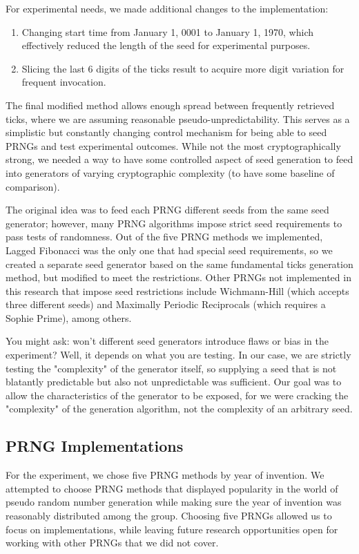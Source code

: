 \documentclass[conference]{IEEEtran}
\begin{document}
For experimental needs, we made additional changes to the implementation:
\begin{enumerate}
    \item Changing start time from January 1, 0001 to January 1, 1970, which effectively reduced the length of the seed for experimental purposes.
    \item Slicing the last 6 digits of the ticks result to acquire more digit variation for frequent invocation.
\end{enumerate}

The final modified method allows enough spread between frequently retrieved ticks, where we are assuming reasonable pseudo-unpredictability. This serves as a simplistic but constantly changing control mechanism for being able to seed PRNGs and test experimental outcomes. While not the most cryptographically strong, we needed a way to have some controlled aspect of seed generation to feed into generators of varying cryptographic complexity (to have some baseline of comparison).

The original idea was to feed each PRNG different seeds from the same seed generator; however, many PRNG algorithms impose strict seed requirements to pass tests of randomness. Out of the five PRNG methods we implemented, Lagged Fibonacci was the only one that had special seed requirements, so we created a separate seed generator based on the same fundamental ticks generation method, but modified to meet the restrictions. Other PRNGs not implemented in this research that impose seed restrictions include Wichmann-Hill (which accepts three different seeds) and Maximally Periodic Reciprocals (which requires a Sophie Prime), among others.

You might ask: won't different seed generators introduce flaws or bias in the experiment? Well, it depends on what you are testing. In our case, we are strictly testing the "complexity" of the generator itself, so supplying a seed that is not blatantly predictable but also not unpredictable was sufficient. Our goal was to allow the characteristics of the generator to be exposed, for we were cracking the "complexity" of the generation algorithm, not the complexity of an arbitrary seed.

\subsection{PRNG Implementations}
For the experiment, we chose five PRNG methods by year of invention. We attempted to choose PRNG methods that displayed popularity in the world of pseudo random number generation while making sure the year of invention was reasonably distributed among the group. Choosing five PRNGs allowed us to focus on implementations, while leaving future research opportunities open for working with other PRNGs that we did not cover.
\end{document}
